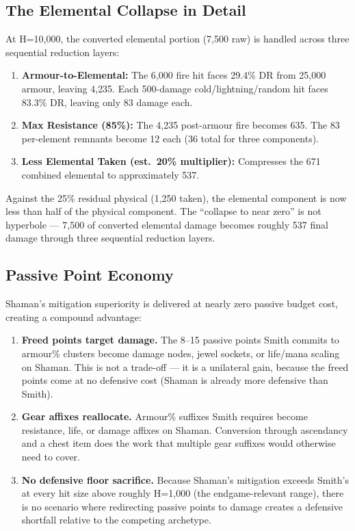 \documentclass[12pt, letterpaper]{article}
\newcommand{\namedsubsection}[1]{%
    \subsection*{#1}%
    \addcontentsline{toc}{subsection}{#1}%
}
\begin{document}
\subsection*{The Elemental Collapse in Detail}

At H=10{,}000, the converted elemental portion (7{,}500 raw) is handled across three sequential reduction layers:

\begin{enumerate}
    \item \textbf{Armour-to-Elemental:} The 6{,}000 fire hit faces 29.4\% DR from 25{,}000 armour, leaving 4{,}235. Each 500-damage cold/lightning/random hit faces 83.3\% DR, leaving only 83 damage each.
    \item \textbf{Max Resistance (85\%):} The 4{,}235 post-armour fire becomes 635. The 83 per-element remnants become 12 each (36 total for three components).
    \item \textbf{Less Elemental Taken (est.\ 20\% multiplier):} Compresses the 671 combined elemental to approximately 537.
\end{enumerate}

Against the 25\% residual physical (1{,}250 taken), the elemental component is now less than half of the physical component. The ``collapse to near zero'' is not hyperbole --- 7{,}500 of converted elemental damage becomes roughly 537 final damage through three sequential reduction layers.

\namedsubsection{Passive Point Economy}

Shaman's mitigation superiority is delivered at nearly zero passive budget cost, creating a compound advantage:

\begin{enumerate}
    \item \textbf{Freed points target damage.} The 8--15 passive points Smith commits to armour\% clusters become damage nodes, jewel sockets, or life/mana scaling on Shaman. This is not a trade-off --- it is a unilateral gain, because the freed points come at no defensive cost (Shaman is already more defensive than Smith).

    \item \textbf{Gear affixes reallocate.} Armour\% suffixes Smith requires become resistance, life, or damage affixes on Shaman. Conversion through ascendancy and a chest item does the work that multiple gear suffixes would otherwise need to cover.

    \item \textbf{No defensive floor sacrifice.} Because Shaman's mitigation exceeds Smith's at every hit size above roughly H=1{,}000 (the endgame-relevant range), there is no scenario where redirecting passive points to damage creates a defensive shortfall relative to the competing archetype.
\end{enumerate}
\end{document}

